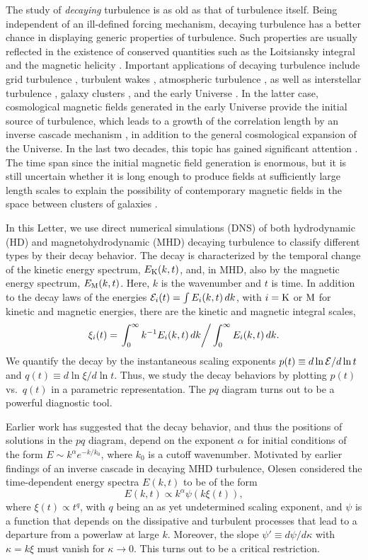 \documentclass[prl,twocolumn,aps,psfig,showpacs,nofootinbib,nobibnotes,superscriptaddress,preprintnumbers,times]{revtex4}
\newcommand{\EQ}{\begin{equation}}
\newcommand{\EN}{\end{equation}}
\def\EK{E_{\rm K}}
\def\EM{E_{\rm M}}
\begin{document}
The study of {\em decaying} turbulence is as old as that of turbulence itself.
Being independent of an ill-defined forcing mechanism, decaying turbulence
has a better chance in displaying generic properties of turbulence.
Such properties are usually reflected in the existence of conserved
quantities such as the Loitsiansky integral \cite{BP56} and the
magnetic helicity \cite{PFL76,BM99}.
Important applications of decaying turbulence include grid turbulence
\cite{SSD99}, turbulent wakes \cite{Cas70}, atmospheric turbulence
\cite{Lil83}, as well as interstellar turbulence \cite{MLKB98},
galaxy clusters \cite{SSH06}, and the early Universe \cite{CHB01,BJ04}.
In the latter case, cosmological magnetic fields generated in the early
Universe provide the initial source of turbulence, which leads to a growth
of the correlation length by an inverse cascade mechanism \cite{BEO96},
in addition to the general cosmological expansion of the Universe.
In the last two decades, this topic has gained significant attention
\cite{Cam15}.
The time span since the initial magnetic field generation is enormous,
but it is still uncertain whether it is long enough to produce fields
at sufficiently large length scales to explain the possibility of
contemporary magnetic fields in the space between clusters of galaxies
\cite{WB16}.

In this Letter, we use direct numerical simulations (DNS) of both
hydrodynamic (HD) and magnetohydrodynamic (MHD) decaying turbulence to
classify different types by their decay behavior.
The decay is characterized by the temporal change of the kinetic
energy spectrum, $\EK(k,t)$, and, in MHD, also by the magnetic energy
spectrum, $\EM(k,t)$.
Here, $k$ is the wavenumber and $t$ is time.
In addition to the decay laws of the energies
${\cal E}_i(t)=\int E_i(k,t)\,dk$, with $i={\rm K}$ or ${\rm M}$ for
kinetic and magnetic energies, there are the kinetic and magnetic
integral scales,
\EQ
\xi_i(t)=\left.\int_0^\infty k^{-1} E_i(k,t)\,dk\right/
\int_0^\infty E_i(k,t)\,dk.
\label{xirelation2}
\EN
We quantify the decay by the instantaneous scaling exponents
$p(t)\equiv d\ln{\cal E}/d\ln t$ and $q(t)\equiv d\ln\xi/d\ln t$.
Thus, we study the decay behaviors by plotting $p(t)$ vs.\ $q(t)$
in a parametric representation.
The $pq$ diagram turns out to be a powerful diagnostic tool.

Earlier work \cite{SSH06,Geo92,Ole97} has suggested that the decay
behavior, and thus the positions of solutions in the $pq$ diagram,
depend on the exponent $\alpha$ for initial conditions of the form
$E\sim k^\alpha e^{-k/k_0}$, where $k_0$ is a cutoff wavenumber.
Motivated by earlier findings \cite{PFL76,BEO96} of an inverse cascade
in decaying MHD turbulence, Olesen considered the time-dependent energy
spectra $E(k,t)$ to be of the form \cite{Ole97}
\EQ
E(k,t)\propto k^\alpha \psi\left(k\xi(t)\right),
\label{scalinglaw}
\EN
where $\xi(t)\propto t^q$, with $q$ being an as yet undetermined
scaling exponent, and $\psi$ is a function that depends on the dissipative
and turbulent processes that lead to a departure from a
powerlaw at large $k$.
Moreover, the slope $\psi'\equiv d\psi/d\kappa$ with $\kappa=k\xi$ must
vanish for $\kappa\to0$.
This turns out to be a critical restriction.
\end{document}
